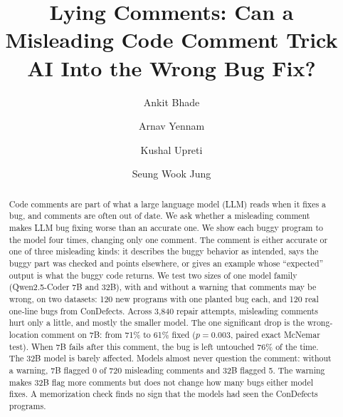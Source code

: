 \documentclass[sigconf,nonacm]{acmart}
\newcommand{\cd}{ConDefects}
\begin{document}
\title{Lying Comments: Can a Misleading Code Comment Trick AI Into the Wrong Bug Fix?}

\author{Ankit Bhade}
\author{Arnav Yennam}
\author{Kushal Upreti}
\author{Seung Wook Jung}

\renewcommand{\shortauthors}{Bhade, Yennam, Upreti, and Jung}

\begin{abstract}
Code comments are part of what a large language model (LLM) reads when it fixes a bug, and comments are often out of date. We ask whether a misleading comment makes LLM bug fixing worse than an accurate one. We show each buggy program to the model four times, changing only one comment. The comment is either accurate or one of three misleading kinds: it describes the buggy behavior as intended, says the buggy part was checked and points elsewhere, or gives an example whose ``expected'' output is what the buggy code returns. We test two sizes of one model family (Qwen2.5-Coder 7B and 32B), with and without a warning that comments may be wrong, on two datasets: 120 new programs with one planted bug each, and 120 real one-line bugs from \cd{}. Across 3,840 repair attempts, misleading comments hurt only a little, and mostly the smaller model. The one significant drop is the wrong-location comment on 7B: from 71\% to 61\% fixed ($p = 0.003$, paired exact McNemar test). When 7B fails after this comment, the bug is left untouched 76\% of the time. The 32B model is barely affected. Models almost never question the comment: without a warning, 7B flagged 0 of 720 misleading comments and 32B flagged 5. The warning makes 32B flag more comments but does not change how many bugs either model fixes. A memorization check finds no sign that the models had seen the \cd{} programs.
\end{abstract}


\maketitle
\end{document}

